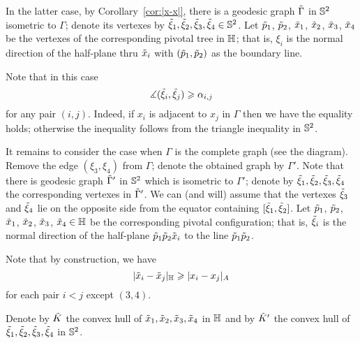 In the latter case, by Corollary~\ref{cor:|x-x|}, there is a geodesic graph $\~\Gamma$ in $\SS^2$ isometric to $\Gamma$;
denote its vertexes by $\~\xi_1,\~\xi_2,\~\xi_3,\~\xi_4\in \SS^2$.
Let $\~p_1$, $\~p_2$, $\~x_1$, $\~x_2$, $\~x_3$, $\~x_4$ be the vertexes of the corresponding pivotal tree in $\HH$;
that is, $\xi_i$ is the normal direction of the half-plane thru $\~x_i$ with $(\~p_1,\~p_2)$ as the boundary line.

Note that in this case
\[\measuredangle(\~\xi_i,\~\xi_j)\ge \alpha_{i,j}\]
for any pair $(i,j)$.
Indeed, if $x_i$ is adjacent to $x_j$ in $\Gamma$ then we have the equality holds;
otherwise the inequality follows from the triangle inequality in $\SS^2$.

\begin{comment}
\begin{wrapfigure}{r}{14 mm}
\begin{tikzpicture}[scale=1,
  thick,main node/.style={circle,draw,font=\sffamily\bfseries,minimum size=3mm}]

  \node[main node] (1) at (0,0) {};
  \node[main node] (2) at (0,1){};
  \node[main node] (3) at (1,1){};
  \node[main node] (4) at (1,0) {};

  \path[every node/.style={font=\sffamily\small}]
   (1) edge node[above]{}(2)
   (2) edge node[above]{}(3)
   (2) edge node[above]{}(4)
   (3) edge node[above]{}(1)
   (3) edge node[above]{}(4)
   (1) edge node[above]{}(4);
\end{tikzpicture}
\end{wrapfigure}
\end{comment}

It remains to consider the case when $\Gamma$ is the complete graph (see the diagram). 
Remove the edge $(\xi_3,\xi_4)$ from $\Gamma$;
denote the obtained graph by $\Gamma'$.
Note that there is geodesic graph $\~\Gamma'$ in $\SS^2$ which is isometric to $\Gamma'$;
denote by $\~\xi_1,\~\xi_2,\~\xi_3,\~\xi_4$ the corresponding vertexes in $\~\Gamma'$.
We can (and will) assume that the vertexes $\~\xi_3$ and $\~\xi_4$ lie on the opposite side from the equator containing $[\~\xi_1,\~\xi_2]$.
Let $\~p_1$, $\~p_2$, $\~x_1$, $\~x_2$, $\~x_3$, $\~x_4\in \HH$ be the corresponding pivotal configuration;
that is, $\~\xi_i$ is the normal direction of the half-plane $\~p_1\~p_2\~x_i$ to the line $\~p_1\~p_2$.

Note that by construction, we have 
\[|\~x_i-\~x_j|_\HH\ge|x_i-x_j|_A\]
for each pair $i<j$ except $(3,4)$.


Denote by $\~K$ the convex hull of $\~x_1,\~x_2,\~x_3,\~x_4$ in $\HH$
and by $\~K'$ the convex hull of $\~\xi_1,\~\xi_2,\~\xi_3,\~\xi_4$ in $\SS^2$.


